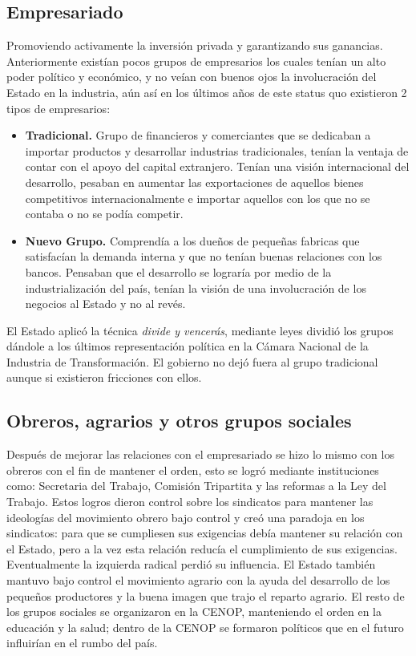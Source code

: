 \subsection{Empresariado}
Promoviendo activamente la inversión privada y garantizando sus ganancias.
Anteriormente existían pocos grupos de empresarios los cuales tenían un alto poder político y económico, y no veían con buenos ojos la involucración del Estado en la industria, aún así en los últimos años de este status quo existieron 2 tipos de empresarios:
\begin{itemize}
    \item \textbf{Tradicional.} Grupo de financieros y comerciantes que se dedicaban a importar productos y desarrollar industrias tradicionales, tenían la ventaja de contar con el apoyo del capital extranjero. Tenían una visión internacional del desarrollo, pesaban en aumentar las exportaciones de aquellos bienes competitivos internacionalmente e importar aquellos con los que no se contaba o no se podía competir.
    \item \textbf{Nuevo Grupo.} Comprendía a los dueños de pequeñas fabricas que satisfacían la demanda interna y que no tenían buenas relaciones con los bancos. Pensaban que el desarrollo se lograría por medio de la industrialización del país, tenían la visión de una involucración de los negocios al Estado y no al revés.
\end{itemize}
El Estado aplicó la técnica \textit{divide y vencerás}, mediante leyes dividió los grupos dándole a los últimos representación política en la Cámara Nacional de la Industria de Transformación. El gobierno no dejó fuera al grupo tradicional aunque si existieron fricciones con ellos.

\subsection{Obreros, agrarios y otros grupos sociales}
Después de mejorar las relaciones con el empresariado se hizo lo mismo con los obreros con el fin de mantener el orden, esto se logró mediante instituciones como: Secretaria del Trabajo, Comisión Tripartita y las reformas a la Ley del Trabajo.
Estos logros dieron control sobre los sindicatos para mantener las ideologías del movimiento obrero bajo control y creó una paradoja en los sindicatos: para que se cumpliesen sus exigencias debía mantener su relación con el Estado, pero a la vez esta relación reducía el cumplimiento de sus exigencias. Eventualmente la izquierda radical perdió su influencia.
El Estado también mantuvo bajo control el movimiento agrario con la ayuda del desarrollo de los pequeños productores y la buena imagen que trajo el reparto agrario.
El resto de los grupos sociales se organizaron en la CENOP, manteniendo el orden en la educación y la salud; dentro de la CENOP se formaron políticos que en el futuro influirían en el rumbo del país.

